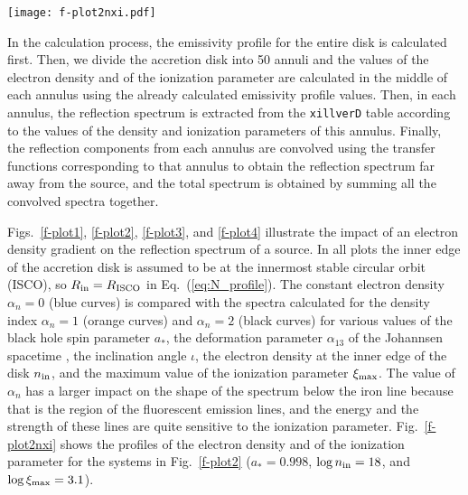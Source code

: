 \documentclass[twocolumn]{emulateapj}
\begin{document}
\begin{figure*}[t]
\begin{center}
    \texttt{[image: f-plot2nxi.pdf]}
\end{center}
\vspace{-0.2cm}
    \caption{Profiles of the electron density $n$ and of the ionization parameter $\xi$ for the astrophysical systems considered in Fig.~\ref{f-plot2}. \label{f-plot2nxi}}
    \vspace{0.5cm}
\end{figure*}



In the calculation process, the emissivity profile for the entire disk is calculated first. Then, we divide the accretion disk into 50 annuli and the values of the electron density and of the ionization parameter are calculated in the middle of each annulus using the already calculated emissivity profile values. Then, in each annulus, the reflection spectrum is extracted from the {\tt xillverD} table according to the values of the density and ionization parameters of this annulus. Finally, the reflection components from each annulus are convolved using the transfer functions corresponding to that annulus to obtain the reflection spectrum far away from the source, and the total spectrum is obtained by summing all the convolved spectra together.


Figs.~\ref{f-plot1}, \ref{f-plot2}, \ref{f-plot3}, and \ref{f-plot4} illustrate the impact of an electron density gradient on the reflection spectrum of a source. In all plots the inner edge of the accretion disk is assumed to be at the innermost stable circular orbit (ISCO), so $R_{\rm in} = R_{\rm ISCO}$ in Eq.~(\ref{eq:N_profile}). The constant electron density $\alpha_n=0$ (blue curves) is compared with the spectra calculated for the density index $\alpha_n=1$ (orange curves) and $\alpha_n=2$ (black curves) for various values of the black hole spin parameter $a_*$, the deformation parameter $\alpha_{13}$ of the Johannsen spacetime \citep[which is the default metric in {\tt relxill\_nk} and was proposed in][specifically for testing the Kerr metric with black hole electromagnetic data]{2013PhRvD..88d4002J}, the inclination angle $\iota$, the electron density at the inner edge of the disk $n_{\rm in}$, and the maximum value of the ionization parameter $\xi_{\rm max}$. The value of $\alpha_n$ has a larger impact on the shape of the spectrum below the iron line because that is the region of the fluorescent emission lines, and the energy and the strength of these lines are quite sensitive to the ionization parameter. Fig.~\ref{f-plot2nxi} shows the profiles of the electron density and of the ionization parameter for the systems in Fig.~\ref{f-plot2} ($a_* = 0.998$, $\log n_{\rm in} = 18$, and $\log\xi_{\rm max} = 3.1$).
\end{document}
